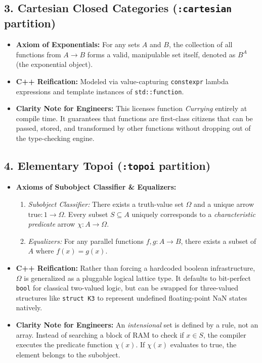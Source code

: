 \subsection{3. Cartesian Closed Categories (\texttt{:cartesian} partition)}
\begin{itemize}
    \item \textbf{Axiom of Exponentials:} For any sets $A$ and $B$, the collection of all functions from $A \to B$ forms a valid, manipulable set itself, denoted as $B^A$ (the exponential object).
    \item \textbf{C++ Reification:} Modeled via value-capturing \texttt{constexpr} lambda expressions and template instances of \texttt{std::function}.
    \item \textbf{Clarity Note for Engineers:} This licenses function \textit{Currying} entirely at compile time. It guarantees that functions are first-class citizens that can be passed, stored, and transformed by other functions without dropping out of the type-checking engine.
\end{itemize}

\subsection{4. Elementary Topoi (\texttt{:topoi} partition)}
\begin{itemize}
    \item \textbf{Axioms of Subobject Classifier \& Equalizers:}
    \begin{enumerate}
        \item \textit{Subobject Classifier:} There exists a truth-value set $\Omega$ and a unique arrow $\text{true}: 1 \to \Omega$. Every subset $S \subseteq A$ uniquely corresponds to a \textit{characteristic predicate} arrow $\chi: A \to \Omega$.
        \item \textit{Equalizers:} For any parallel functions $f, g: A \to B$, there exists a subset of $A$ where $f(x) = g(x)$.
    \end{enumerate}
    \item \textbf{C++ Reification:} Rather than forcing a hardcoded boolean infrastructure, $\Omega$ is generalized as a pluggable logical lattice type. It defaults to bit-perfect \texttt{bool} for classical two-valued logic, but can be swapped for three-valued structures like \texttt{struct K3} to represent undefined floating-point NaN states natively.
    \item \textbf{Clarity Note for Engineers:} An \textit{intensional} set is defined by a rule, not an array. Instead of searching a block of RAM to check if $x \in S$, the compiler executes the predicate function $\chi(x)$. If $\chi(x)$ evaluates to true, the element belongs to the subobject.
\end{itemize}

